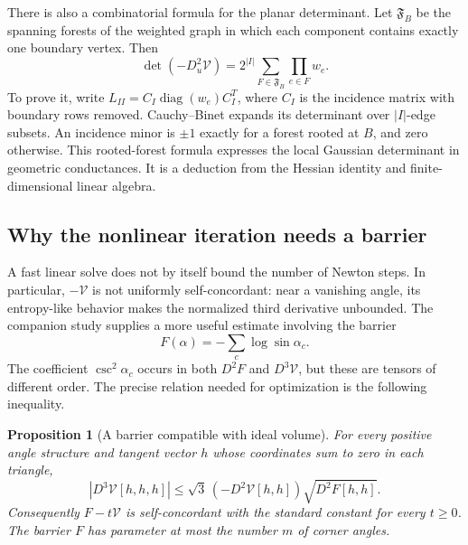 \documentclass[11pt,a4paper]{article}
\numberwithin{equation}{section}
\newtheorem{proposition}[theorem]{Proposition}
\theoremstyle{definition}
\theoremstyle{remark}
\begin{document}
There is also a combinatorial formula for the planar determinant. Let
$\mathfrak F_B$ be the spanning forests of the weighted graph in which
each component contains exactly one boundary vertex. Then
\begin{equation}
 \boxed{\det(-D_u^2\mathcal V)
      =2^{|I|}\sum_{F\in\mathfrak F_B}\prod_{e\in F}w_e.}
 \label{eq:ipolyForestDeterminant}
\end{equation}
To prove it, write $L_{II}=C_I\operatorname{diag}(w_e)C_I^T$, where
$C_I$ is the incidence matrix with boundary rows removed. Cauchy--Binet
expands its determinant over $|I|$-edge subsets. An incidence minor is
$\pm1$ exactly for a forest rooted at $B$, and zero otherwise. This
rooted-forest formula expresses the local Gaussian determinant in
geometric conductances. It is a deduction from the Hessian identity
and finite-dimensional linear algebra.

\subsection{Why the nonlinear iteration needs a barrier}

A fast linear solve does not by itself bound the number of Newton
steps. In particular, $-\mathcal V$ is not uniformly self-concordant:
near a vanishing angle, its entropy-like behavior makes the normalized
third derivative unbounded. The companion study supplies a more useful
estimate involving the barrier
\begin{equation}
 F(\alpha)=-\sum_c\log\sin\alpha_c.
 \label{eq:ipolyBarrier}
\end{equation}
The coefficient $\csc^2\alpha_c$ occurs in both $D^2F$ and
$D^3\mathcal V$, but these are tensors of different order. The precise
relation needed for optimization is the following inequality.

\begin{proposition}[A barrier compatible with ideal volume]
\label{prop:ipolyCompatibility}
For every positive angle structure and tangent vector $h$ whose
coordinates sum to zero in each triangle,
\begin{equation}
 |D^3\mathcal V[h,h,h]|
 \le\sqrt3\,(-D^2\mathcal V[h,h])\sqrt{D^2F[h,h]}.
 \label{eq:ipolyCompatibility}
\end{equation}
Consequently $F-t\mathcal V$ is self-concordant with the standard
constant for every $t\ge0$. The barrier $F$ has parameter at most
the number $m$ of corner angles.
\end{proposition}
\end{document}

